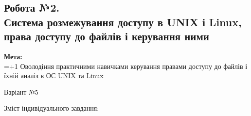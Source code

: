 \documentclass[a4paper,12pt]{article}
\begin{document}
\newpage
    \begin{center}
        \section*{\bfseries{Робота №2.\\
        Система розмежування доступу в UNIX і
        Linux, права доступу до файлів і керування ними}}
    \end{center}
    \textbf{Мета:} \\
    \hangindent=1.5cm 
    \hangafter=+1 \noindent
    Оволодіння практичними навичками керування
    правами доступу до файлів і їхній аналіз в ОС UNIX та
    Linux \\
    \begin{center}
        \Large{Варіант №5}
    \end{center}
    Зміст індивідуального завдання:
\end{document}
